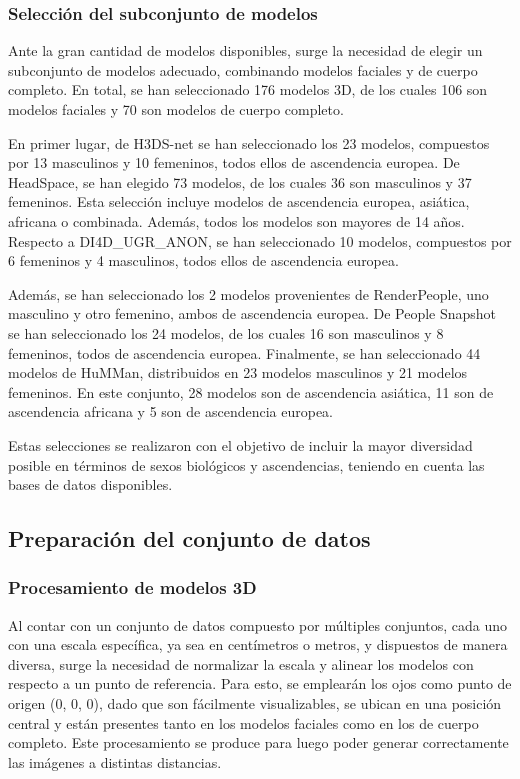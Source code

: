 \subsubsection{Selección del subconjunto de modelos}

Ante la gran cantidad de modelos disponibles, surge la necesidad de elegir un subconjunto de modelos adecuado, combinando modelos faciales y de cuerpo completo.
En total, se han seleccionado 176 modelos 3D, de los cuales 106 son modelos faciales y 70 son modelos de cuerpo completo.

En primer lugar, de H3DS-net se han seleccionado los 23 modelos, compuestos por 13 masculinos y 10 femeninos, todos ellos de ascendencia europea. 
De HeadSpace, se han elegido 73 modelos, de los cuales 36 son masculinos y 37 femeninos. Esta selección incluye modelos de ascendencia europea, asiática, africana o combinada. Además, todos los modelos son mayores de 14 años.
Respecto a DI4D\_UGR\_ANON, se han seleccionado 10 modelos, compuestos por 6 femeninos y 4 masculinos, todos ellos de ascendencia europea.

Además, se han seleccionado los 2 modelos provenientes de RenderPeople, uno masculino y otro femenino, ambos de ascendencia europea.
De People Snapshot se han seleccionado los 24 modelos, de los cuales 16 son masculinos y 8 femeninos, todos de ascendencia europea.
Finalmente, se han seleccionado 44 modelos de HuMMan, distribuidos en 23 modelos masculinos y 21 modelos femeninos. En este conjunto, 28 modelos son de ascendencia asiática, 11 son de ascendencia africana y 5 son de ascendencia europea.

Estas selecciones se realizaron con el objetivo de incluir la mayor diversidad posible en términos de sexos biológicos y ascendencias, teniendo en cuenta las bases de datos disponibles.

\subsection{Preparación del conjunto de datos}

\subsubsection{Procesamiento de modelos 3D}

Al contar con un conjunto de datos compuesto por múltiples conjuntos, cada uno con una escala específica, ya sea en centímetros o metros, y dispuestos de manera diversa, surge la necesidad de normalizar la escala y alinear los modelos con respecto a un punto de referencia. Para esto, se emplearán los ojos como punto de origen (0, 0, 0), dado que son fácilmente visualizables, se ubican en una posición central y están presentes tanto en los modelos faciales como en los de cuerpo completo. Este procesamiento se produce para luego poder generar correctamente las imágenes a distintas distancias.

